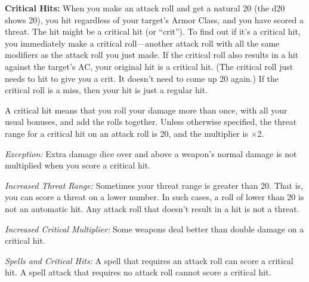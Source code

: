 \textbf{Critical Hits:} When you make an attack roll and get a natural 20 (the d20 shows 20), you hit regardless of your target's Armor Class, and you have scored a threat. The hit might be a critical hit (or ``crit''). To find out if it's a critical hit, you immediately make a critical roll---another attack roll with all the same modifiers as the attack roll you just made. If the critical roll also results in a hit against the target's AC, your original hit is a critical hit. (The critical roll just needs to hit to give you a crit. It doesn't need to come up 20 again.) If the critical roll is a miss, then your hit is just a regular hit.

A critical hit means that you roll your damage more than once, with all your usual bonuses, and add the rolls together. Unless otherwise specified, the threat range for a critical hit on an attack roll is 20, and the multiplier is $\times$2.

\textit{Exception:} Extra damage dice over and above a weapon's normal damage is not multiplied when you score a critical hit.

\textit{Increased Threat Range:} Sometimes your threat range is greater than 20. That is, you can score a threat on a lower number. In such cases, a roll of lower than 20 is not an automatic hit. Any attack roll that doesn't result in a hit is not a threat.

\textit{Increased Critical Multiplier:} Some weapons deal better than double damage on a critical hit.

\textit{Spells and Critical Hits:} A spell that requires an attack roll can score a critical hit. A spell attack that requires no attack roll cannot score a critical hit.